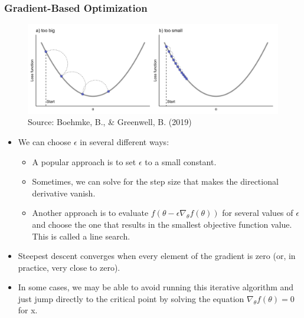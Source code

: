 \documentclass[
  shownotes,
  xcolor={svgnames},
  hyperref={colorlinks,citecolor=DarkBlue,linkcolor=DarkRed,urlcolor=DarkBlue}
  , aspectratio=169]{beamer}
\begin{document}
\begin{frame}[fragile]
\frametitle{Gradient-Based Optimization}


\begin{figure}[H] \centering
  \centering
  \includegraphics[scale=0.3]{figures/step_size2.png}
  \\
  \tiny
  Source: Boehmke, B., \& Greenwell, B. (2019)
\end{figure}

\begin{itemize}
  \footnotesize
\item We can choose $\epsilon$ in several different ways:
\begin{itemize}
  \tiny
\item A popular approach is to set $\epsilon$ to a small constant. 
 \item Sometimes, we can solve for the step size that makes the directional derivative vanish. 
 \item Another approach is to evaluate $f(\theta-\epsilon \nabla_\theta f(\theta))$ for several values of 
 $\epsilon$ and choose the one that results in the smallest objective function value. This  is called a line search.
\end{itemize}
 

\item Steepest descent converges when every element of the gradient is zero (or, in practice, very close to zero). 
\item In some cases, we may be able to avoid running this iterative algorithm and just jump directly to the critical point by solving the equation $\nabla_\theta f(\theta)=0$ for x.

\end{itemize}




 \end{frame}
\end{document}
